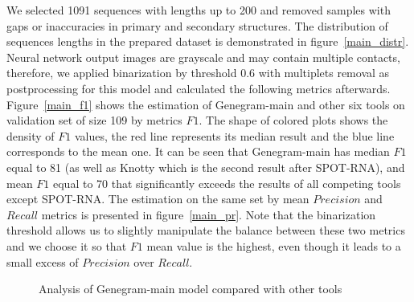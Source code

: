 We selected 1091 sequences with lengths up to 200 and removed samples with gaps or inaccuracies in primary and secondary structures. The distribution of sequences lengths in the prepared dataset is demonstrated in figure~\ref{main_distr}. Neural network output images are grayscale and may contain multiple contacts, therefore, we applied binarization by threshold 0.6 with multiplets removal as postprocessing for this model and calculated the following metrics afterwards. Figure~\ref{main_f1} shows the estimation of Genegram-main and other six tools on validation set of size 109 by metrics $F1$. The shape of colored plots shows the density of $F1$ values, the red line represents its median result and the blue line corresponds to the mean one. It can be seen that Genegram-main has median $F1$ equal to 81 (as well as Knotty which is the second result after SPOT-RNA), and mean $F1$ equal to 70 that significantly exceeds the results of all competing tools except SPOT-RNA. The estimation on the same set by mean $Precision$ and $Recall$ metrics is presented in figure~\ref{main_pr}. Note that the binarization threshold allows us to slightly manipulate the balance between these two metrics and we choose it so that $F1$ mean value is the highest, even though it leads to a small excess of $Precision$ over $Recall$.

\begin{figure}[h]
\centering
    \hfill
    \par 
\caption{Analysis of Genegram-main model compared with other tools }
\label{plots_main}
\end{figure}

